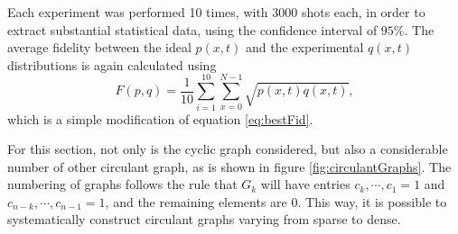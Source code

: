 \documentclass[../../dissertation.tex]{subfiles}
\begin{document}
Each experiment was performed 10 times, with $3000$ shots each, in order to
extract substantial statistical data, using the confidence interval of $95\%$.
The average fidelity between the ideal $p(x,t)$ and the experimental $q(x,t)$
distributions is again calculated using
\begin{equation}
    F(p,q) = \frac{1}{10}\sum_{i = 1}^{10} \sum_{x=0}^{N-1} \sqrt{p(x,t)q(x,t)},
    \label{eq:avgFid}
\end{equation}
which is a simple modification of equation \eqref{eq:bestFid}.\par

For this section, not only is the cyclic graph considered, but also a considerable
number of other circulant graph, as is shown in figure
\ref{fig:circulantGraphs}. The numbering of graphs follows the rule that
$G_k$ will have entries $c_k, \cdots, c_1 = 1$ and $c_{n-k},\cdots,c_{n-1} =
1$, and the remaining elements are $0$. This way, it is possible to
systematically construct circulant graphs varying from sparse to dense.  
\end{document}
